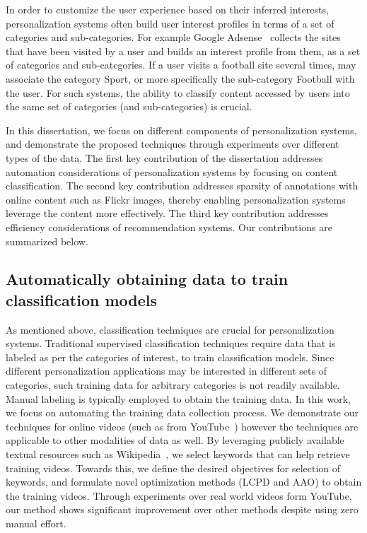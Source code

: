 \documentclass[12pt]{ucsddissertation}
\begin{document}
In order to customize the user experience based on their inferred interests, personalization systems often build user interest profiles in terms of a set of categories and sub-categories. For example Google Adsense~\cite{GoogleAdsense} collects the sites that have been visited by a user and builds an interest profile from them, as a set of categories and sub-categories. If a user visits a football site several times, \cite{GoogleAdsense} may associate the category Sport, or more specifically the sub-category Football with the user. For such systems, the ability to classify content accessed by users into the same set of categories (and sub-categories) is crucial. 

In this dissertation, we focus on different components of personalization systems, and demonstrate the proposed techniques through experiments over different types of the data. The first key contribution of the dissertation addresses automation considerations of personalization systems by focusing on content classification. The second key contribution addresses sparsity of annotations with online content such as Flickr images, thereby enabling personalization systems leverage the content more effectively. The third key contribution addresses efficiency considerations of recommendation systems. Our contributions are summarized below. 

\subsection{Automatically obtaining data to train classification models}

As mentioned above, classification techniques are crucial for personalization systems. Traditional supervised classification techniques require data that is labeled as per the categories of interest, to train classification models. Since different personalization applications may be interested in different sets of categories, such training data for arbitrary categories is not readily available. Manual labeling is typically employed to obtain the training data. In this work, we focus on automating the training data collection process. We demonstrate our techniques for online videos (such as from YouTube~\cite{YouTube}) however the techniques are applicable to other modalities of data as well. By leveraging publicly available textual resources such as Wikipedia~\cite{website:Wikipedia}, we select keywords that can help retrieve training videos. Towards this, we define the desired objectives for selection of keywords, and formulate novel optimization methods (LCPD and AAO) to obtain the training videos. Through experiments over real world videos form YouTube, our method shows significant improvement over other methods despite using zero manual effort. 
\end{document}
